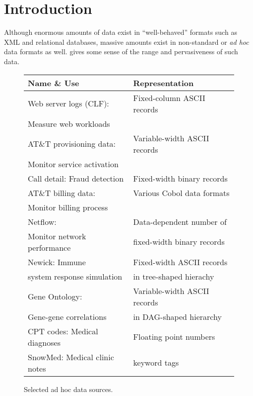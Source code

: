 \section{Introduction}
\label{section:intro}
Although enormous amounts of data exist in ``well-behaved'' formats such
as XML and relational databases, massive amounts exist in
non-standard or \textit{ad hoc} data formats as well. 
gives some sense of the range and pervasiveness of such data.
\begin{figure}
\begin{center}
\begin{tabular}{|l|l|}
\hline
Name \& Use   &  Representation               \\ \hline\hline
Web server logs (CLF):  &  Fixed-column ASCII records \\ 
Measure web workloads &                             \\ \hline
AT\&T provisioning data: & Variable-width ASCII records  \\ 
Monitor service activation &                              \\ \hline
Call detail: Fraud detection  &  Fixed-width binary records \\  \hline 
AT\&T billing data: & Various Cobol data formats  \\ 
Monitor billing process   &                             \\ \hline
Netflow:                        & Data-dependent number of     \\ 
Monitor network performance  & fixed-width binary records  \\ \hline
Newick:   Immune                 & Fixed-width ASCII records \\ 
system response simulation & in tree-shaped hierachy\\ \hline                                
Gene Ontology:             & Variable-width ASCII records \\
Gene-gene correlations     & in DAG-shaped hierarchy \\ \hline
CPT codes: Medical diagnoses & Floating point numbers \\ \hline
SnowMed: Medical clinic notes & keyword tags  \\ \hline
\end{tabular}

\caption{Selected ad hoc data sources.}
\label{figure:data-sources}
\end{center}
\end{figure}
